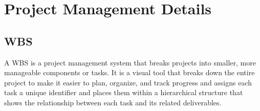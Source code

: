 \documentclass[12pt]{article} %
\begin{document}
\clearpage

\vspace{1cm}

\clearpage


\section{Project Management Details}

\subsection{\acrfull{WBS}}
A \acrshort{WBS} is a project management system that breaks projects into smaller, more manageable components or tasks. It is a visual tool that breaks down the entire project to make it easier to plan, organize, and track progress and assigns each task a unique identifier and places them within a hierarchical structure that shows the relationship between each task and its related deliverables.
\end{document}
